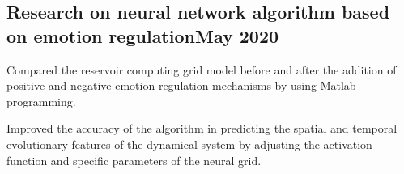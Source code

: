 \documentclass[a4paper, 12pt]{article}
\begin{document}
\subsection {{Research on neural network algorithm based on emotion regulation}\hfill May 2020}
\begin{zitemize}
\item Compared the reservoir computing grid model before and after the addition of positive and negative emotion regulation mechanisms by using Matlab programming. 
\item Improved the accuracy of the algorithm in predicting the spatial and temporal evolutionary features of the dynamical system by adjusting the activation function and specific parameters of the neural grid.  
\end{zitemize}
\end{document}
